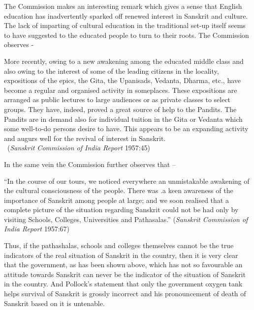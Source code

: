 The Commission makes an interesting remark which gives a sense that English education has inadvertently sparked off renewed interest in Sanskrit and culture. The lack of imparting of cultural education in the traditional set-up itself seems to have suggested to the educated people to turn to their roots. The Commission observes -        
\begin{myquote}
\eleven
More recently, owing to a new awakening among the educated middle class and also owing to the interest of some of the leading citizens in the locality, expositions of the epics, the Gita, the Upanisads, Vedanta, Dharma, etc., have become a regular and organised activity in some\break places. These expositions are arranged as public lectures to large audiences or as private classes to select groups. They have, indeed, proved a great source of help to the Pandits. The Pandits are in demand also for individual tuition in the Gita or Vedanta which some well-to-do persons desire to have. This appears to be an expanding activity and augurs well for the revival of interest in Sanskrit.\\[-15pt]

~\hfill ({\sl Sanskrit Commission of India Report} 1957:45)
\end{myquote}

In the same vein the Commission further observes that – 
\begin{myquote}
\eleven
“In the course of our tours, we noticed everywhere an unmistakable awakening of the cultural consciousness of the people. There was .a keen awareness of the importance of Sanskrit among people at large; and we soon realised that a complete picture of the situation regarding Sanskrit could not be had only by visiting Schools, Colleges, Universities and Pathasalas.” \hfill ({\sl Sanskrit Commission of India Report} 1957:67)
\end{myquote}
\newpage

Thus, if the pathashalas, schools and colleges themselves cannot be the true indicators of the real situation of Sanskrit in the country, then it is very clear that the government, as has been shown above, which has not so favourable an attitude towards Sanskrit can never be the indicator of the situation of Sanskrit in the country. And Pollock’s statement that only the government oxygen tank helps survival of Sanskrit is grossly incorrect and his pronouncement of death of Sanskrit based on it is untenable.

